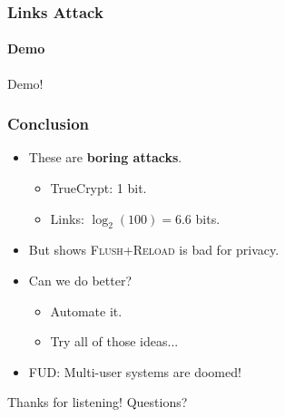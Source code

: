 \documentclass{beamer}
\begin{document}
\begin{frame}
    \frametitle{Links Attack}
    \framesubtitle{Demo}

    \begin{center}
    {\Large Demo!}
    \end{center}
\end{frame}



\begin{frame}
    \frametitle{Conclusion}

    \begin{itemize}
        \item These are \textbf{boring attacks}.
        \begin{itemize}
            \item TrueCrypt: 1 bit.
            \item Links: $\log_2(100) = 6.6$ bits.
        \end{itemize}
        \item But shows \textsc{Flush+Reload} is bad for privacy.
        \item Can we do better?
            \begin{itemize}
                \item Automate it.
                \item Try all of those ideas...
            \end{itemize}
        \item FUD: Multi-user systems are doomed!
    \end{itemize}
\end{frame}

\begin{frame}
    Thanks for listening! Questions?
\end{frame}
\end{document}
